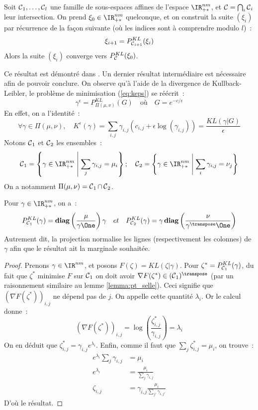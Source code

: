 \begin{lemma}\label{lemma:bregman}
Soit $\operatorname{\mathcal{C}}_1, \ldots, \operatorname{\mathcal{C}}_l$ une famille de sous-espaces affines de l'espace $\IR_{+*}^{nm}$, et $\operatorname{\mathcal{C}} = \bigcap_i \operatorname{\mathcal{C}}_i$ leur intersection. On prend $\xi_0 \in \IR_{+*}^{nm}$ quelconque, et on construit la suite $(\xi_i)$ par récurrence de la façon suivante (où les indices sont à comprendre modulo $l$)~:
\[
\xi_{i+1} = P^{KL}_{\operatorname{\mathcal{C}}_{i+1}}(\xi_i)
\]
Alors la suite $(\xi_i)$ converge vers $P^{KL}_{\operatorname{\mathcal{C}}} (\xi_0)$. 
\end{lemma}
Ce résultat est démontré dans \cite{bregman66}. Un dernier résultat intermédiaire est nécessaire afin de pouvoir conclure. On observe qu'à l'aide de la divergence de Kullback-Leibler, le problème de minimisation (\ref{eq:keps}) se réécrit~:
\[
\gamma^\epsilon = P^{KL}_{\Pi(\mu,\nu)} (G)
\quad \text{où} \quad G = e^{-c/\epsilon}
\]
En effet, on a l'identité~:
\[
\forall \gamma \in \Pi(\mu,\nu), 
\quad K^\epsilon(\gamma) 
= \sum_{i,j} \gamma_{i,j} (c_{i,j} + \epsilon \log(\gamma_{i,j}))
= \frac{KL(\gamma | G)}{\epsilon} 
\]
Notons $\operatorname{\mathcal{C}}_1$ et $\operatorname{\mathcal{C}}_2$ les ensembles~:
\[
\Ccal_1 = \left\{ \gamma \in \IR_{+*}^{nm} \;\middle|\; \sum_j \gamma_{i,j} = \mu_i \right\}
; \quad
\Ccal_2 = \left\{ \gamma \in \IR_{+*}^{nm} \;\middle|\; \sum_i \gamma_{i,j} = \nu_j \right\}
\]
On a notamment $\Pi(\mu,\nu) = \operatorname{\mathcal{C}}_1 \cap \operatorname{\mathcal{C}}_2$.
\begin{lemma}\label{lemma:pkl_c1c2}
Pour $\gamma \in \IR_{+*}^{nm}$, on a~:
\begin{equation}
P^{KL}_{\Ccal_1} (\gamma) = \diag \left(\frac{\mu}{\gamma \One} \right) \gamma
\quad et \quad
P^{KL}_{\Ccal_2} (\gamma) = \gamma \diag \left(\frac{\nu}{\gamma^\transpose \One} \right)
\end{equation}
Autrement dit, la projection normalise les lignes (respectivement les colonnes) de $\gamma$ afin que le résultat ait la marginale souhaitée.
\end{lemma}
\begin{proof}
Prenons $\gamma \in \IR^{nm}$, et posons $F(\zeta) = KL(\zeta | \gamma)$. Pour $\zeta^* = P^{KL}_{\operatorname{\mathcal{C}}_1} (\gamma)$, du fait que $\zeta^*$ minimise $F$ sur $\operatorname{\mathcal{C}}_1$ on doit avoir $\nabla F (\zeta^*) \in (\Ccal_1)^\transpose$ (par un raisonnement similaire au lemme \ref{lemma:pt_selle}). Ceci signifie que $(\nabla F (\zeta^*))_{i,j}$ ne dépend pas de $j$. On appelle cette quantité $\lambda_i$. Or le calcul donne~:
\[
\left(\nabla F (\zeta^*)\right) _{i,j} = \log \left(\frac{\zeta^*_{i,j}}{\gamma_{i,j}} \right) = \lambda_i
\]
On en déduit que $\zeta^*_{i,j} = \gamma_{i,j} e^{\lambda_i}$. Enfin, comme il faut que $\sum_{j} \zeta^*_{i,j} = \mu_i$, on trouve~:
\[\begin{split}
e^{\lambda_i} \sum_j \gamma_{i,j} &= \mu_i \\
e^{\lambda_i} &= \frac{\mu_i}{\sum_{j} \gamma_{i,j}} \\
\zeta_{i,j} &= \gamma_{i,j} \frac{\mu_i}{\sum_{j'} \gamma_{i,j'}}
\end{split}\]
D'où le résultat.
\end{proof}
